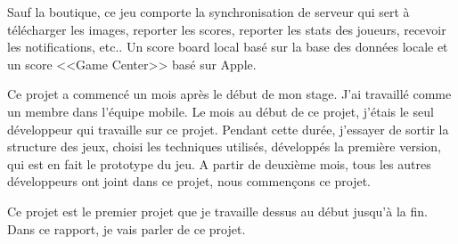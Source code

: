 Sauf la boutique, ce jeu comporte la synchronisation de serveur qui sert à télécharger les images, reporter les scores, reporter les stats des joueurs, recevoir les notifications, etc.. Un score board local basé sur la base des données locale et un score <<Game Center>> basé sur Apple.

Ce projet a commencé un mois après le début de mon stage. J'ai travaillé comme un membre dans l'équipe mobile. Le mois au début de ce projet, j'étais le seul développeur qui travaille sur ce projet. Pendant cette durée, j'essayer de sortir la structure des jeux, choisi les techniques utilisés, développés la première version, qui est en fait le prototype du jeu. A partir de deuxième mois, tous les autres développeurs ont joint dans ce projet, nous commençons ce projet.

Ce projet est le premier projet que je travaille dessus au début jusqu'à la fin. Dans ce rapport, je vais parler de ce projet.


